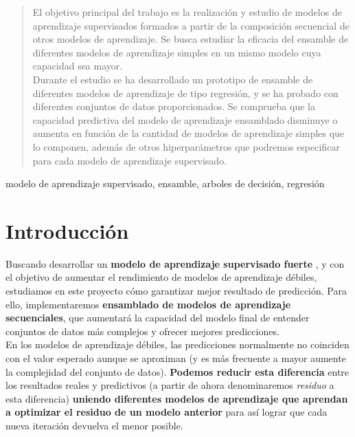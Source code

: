 \documentclass[conference,a4paper]{IEEEtran}
\begin{document}
\begin{abstract}

  El objetivo principal del trabajo es la realización y estudio de modelos de aprendizaje supervisados formados a partir de la composición secuencial de otros modelos de aprendizaje. Se busca estudiar la eficacia del ensamble de diferentes modelos de aprendizaje simples en un mismo modelo cuya capacidad sea mayor. \\
  
  Durante el estudio se ha desarrollado un prototipo de ensamble de diferentes modelos de aprendizaje de tipo regresión, y se ha probado con diferentes conjuntos de datos proporcionados. Se comprueba que la capacidad predictiva del modelo de aprendizaje ensamblado disminuye o aumenta en función de la cantidad de modelos de aprendizaje simples que lo componen, además de otros hiperparámetros que podremos especificar para cada modelo de aprendizaje supervisado. \\ 

\end{abstract}


\begin{IEEEkeywords}
  modelo de aprendizaje supervisado, ensamble, arboles de decisión, regresión
\end{IEEEkeywords}


\section{Introducción}

Buscando desarrollar un \textbf{modelo de aprendizaje supervisado fuerte} \cite{b7}, y con el objetivo de aumentar el rendimiento de modelos de aprendizaje débiles, estudiamos en este proyecto cómo garantizar mejor resultado de predicción. Para ello, implementaremos \textbf{ensamblado de modelos de aprendizaje secuenciales}, que aumentará la capacidad del modelo final de entender conjuntos de datos más complejos y ofrecer mejores predicciones. \\

En los modelos de aprendizaje débiles, las predicciones normalmente no coinciden con el valor esperado aunque se aproximan (y es más frecuente a mayor aumente la complejidad del conjunto de datos). \textbf{Podemos reducir esta diferencia} entre los resultados reales y predictivos (a partir de ahora denominaremos \textit{residuo} a esta diferencia) \textbf{uniendo diferentes modelos de aprendizaje que aprendan a optimizar el residuo de un modelo anterior} para así lograr que cada nueva iteración devuelva el menor posible. \\
\end{document}
